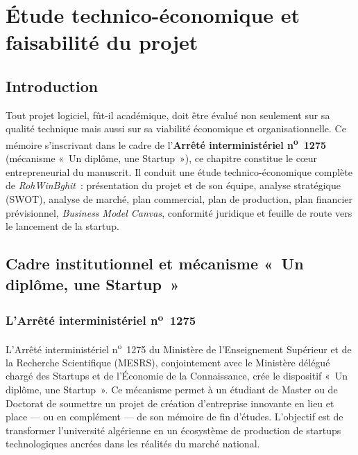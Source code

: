 \documentclass[12pt, a4paper, oneside]{report}
\begin{document}
\chapter{Étude technico-économique et faisabilité du projet}
\label{chap:business}

\section*{Introduction}

Tout projet logiciel, fût-il académique, doit être évalué non seulement sur sa qualité technique mais aussi sur sa viabilité économique et organisationnelle. Ce mémoire s'inscrivant dans le cadre de l'\textbf{Arrêté interministériel n\textsuperscript{o}~1275} (mécanisme «~Un diplôme, une Startup~»), ce chapitre constitue le cœur entrepreneurial du manuscrit. Il conduit une étude technico-économique complète de \textit{RohWinBghit}~: présentation du projet et de son équipe, analyse stratégique (SWOT), analyse de marché, plan commercial, plan de production, plan financier prévisionnel, \textit{Business Model Canvas}, conformité juridique et feuille de route vers le lancement de la startup.

\section{Cadre institutionnel et mécanisme «~Un diplôme, une Startup~»}
\label{sec:arrete1275}

\subsection{L'Arrêté interministériel n\textsuperscript{o}~1275}

L'Arrêté interministériel n\textsuperscript{o}~1275 du Ministère de l'Enseignement Supérieur et de la Recherche Scientifique (MESRS), conjointement avec le Ministère délégué chargé des Startups et de l'Économie de la Connaissance, crée le dispositif «~Un diplôme, une Startup~». Ce mécanisme permet à un étudiant de Master ou de Doctorat de soumettre un projet de création d'entreprise innovante en lieu et place --- ou en complément --- de son mémoire de fin d'études. L'objectif est de transformer l'université algérienne en un écosystème de production de startups technologiques ancrées dans les réalités du marché national.
\end{document}
